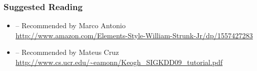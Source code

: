 \documentclass[t]{beamer}
\begin{document}
\begin{frame}
  \frametitle{Suggested Reading}
  \begin{itemize}
  \item {} -- Recommended by Marco Antonio\\
    \url{http://www.amazon.com/Elements-Style-William-Strunk-Jr/dp/1557427283}
  \item {} -- Recommended by Mateus Cruz\\
    \url{http://www.cs.ucr.edu/~eamonn/Keogh_SIGKDD09_tutorial.pdf}
  \end{itemize}
\end{frame}
\end{document}

